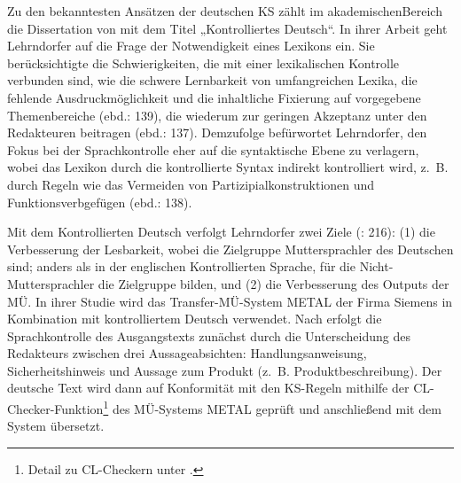 Zu den bekanntesten Ansätzen der deutschen KS zählt im akademischen\linebreak Bereich die Dissertation von \citet{Lehrndorfer1996a} mit dem Titel „Kontrolliertes Deutsch“. In ihrer Arbeit geht Lehrndorfer auf die Frage der Notwendigkeit eines Lexikons ein. Sie berücksichtigte die Schwierigkeiten, die mit einer lexikalischen Kontrolle verbunden sind, wie die schwere Lernbarkeit von umfangreichen Lexika, die fehlende Ausdruckmöglichkeit und die inhaltliche Fixierung auf vorgegebene Themenbereiche (ebd.: 139), die wiederum zur geringen Akzeptanz unter den Redakteuren beitragen (ebd.: 137). Demzufolge befürwortet Lehrndorfer, den Fokus bei der Sprachkontrolle eher auf die syntaktische Ebene zu verlagern, wobei das Lexikon durch die kontrollierte Syntax indirekt kontrolliert wird, z.~B. durch Regeln wie das Vermeiden von Partizipialkonstruktionen und Funktionsverbgefügen (ebd.: 138).

Mit dem Kontrollierten Deutsch verfolgt Lehrndorfer zwei Ziele (\citealt{DrewerZiegler2014}: 216): (1) die Verbesserung der Lesbarkeit, wobei die Zielgruppe Muttersprachler des Deutschen sind; anders als in der englischen Kontrollierten Sprache, für die  Nicht-Muttersprachler die Zielgruppe bilden, und (2) die Verbesserung des Outputs der MÜ. In ihrer Studie wird das Transfer-MÜ-System METAL der Firma Siemens in Kombination mit kontrolliertem Deutsch verwendet. Nach \citet[155]{Lehrndorfer1996a} erfolgt die Sprachkontrolle des Ausgangstexts zunächst durch die Unterscheidung des Redakteurs zwischen drei Aussageabsichten: Handlungsanweisung, Sicherheitshinweis und Aussage zum Produkt (z.~B. Produktbeschreibung). Der deutsche Text wird dann auf Konformität mit den KS-Regeln mithilfe der CL-Checker-Funktion\footnote{{{{Detail zu CL-Checkern unter .}}}} des MÜ-Systems METAL geprüft und anschließend mit dem System übersetzt.

